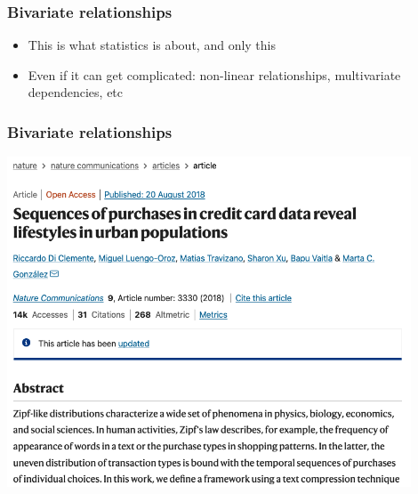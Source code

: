 \documentclass[aspectratio=43]{beamer}
\begin{document}
\begin{frame}
\frametitle{Bivariate relationships}
\centering

\begin{itemize}[<+->]
  \item This is what statistics is about, and only this
  \item Even if it can get complicated: non-linear relationships, multivariate dependencies, etc
\end{itemize}

\end{frame}

\begin{frame}
\frametitle{Bivariate relationships}
\centering

\includegraphics[width = 0.9\textwidth]{../img/nature_creditcard}

\end{frame}
\end{document}
